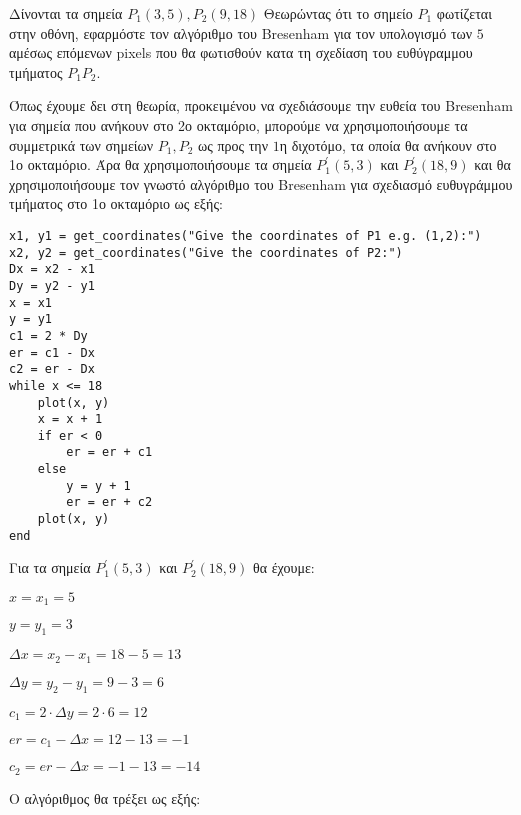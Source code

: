 \begin{exercise}
	Δίνονται τα σημεία $P_1(3, 5), P_2 (9, 18)$ Θεωρώντας ότι το σημείο $P_1$ φωτίζεται στην οθόνη, εφαρμόστε τον αλγόριθμο του Bresenham για τον υπολογισμό των $5$ αμέσως επόμενων pixels που θα φωτισθούν κατα τη σχεδίαση του ευθύγραμμου τμήματος $P_1 P_2$.	
\end{exercise}


\begin{solution}

Όπως έχουμε δει στη θεωρία, προκειμένου να σχεδιάσουμε την ευθεία του Bresenham για σημεία που ανήκουν στο 2ο οκταμόριο, μπορούμε να χρησιμοποιήσουμε τα συμμετρικά των σημείων $P_1, P_2$ ως προς την $1$η διχοτόμο, τα οποία θα ανήκουν στο 1ο οκταμόριο. Άρα θα χρησιμοποιήσουμε τα σημεία $P_1^{'}(5,3)$ και $P_2^{'}(18,9)$ και θα χρησιμοποιήσουμε τον γνωστό αλγόριθμο του Bresenham για σχεδιασμό ευθυγράμμου τμήματος στο 1ο οκταμόριο ως εξής:

\begin{lstlisting}[caption={Αλγόριθμος του Bresenham για 1ο οκταμόριο}]
x1, y1 = get_coordinates("Give the coordinates of P1 e.g. (1,2):")
x2, y2 = get_coordinates("Give the coordinates of P2:")
Dx = x2 - x1
Dy = y2 - y1
x = x1
y = y1
c1 = 2 * Dy
er = c1 - Dx
c2 = er - Dx
while x <= 18
    plot(x, y)
    x = x + 1
    if er < 0
        er = er + c1
    else
        y = y + 1
        er = er + c2
    plot(x, y)
end
\end{lstlisting}


Για τα σημεία \( P_1^{'}(5, 3) \) και \( P_2^{'}(18, 9) \) θα έχουμε:

\begin{itemize}[noitemsep, topsep=0pt] %
\begin{multicols}{2} %
  \item \( x = x_1 = 5 \)
  \item \( y = y_1 = 3 \)
  \item \( \Delta x = x_2 - x_1 = 18 - 5 = 13 \)
  \item \( \Delta y = y_2 - y_1 = 9 - 3 = 6 \)
  \item \( c_1 = 2 \cdot \Delta y = 2 \cdot 6 = 12 \)
  \item \( er = c_1 - \Delta x = 12 - 13 = -1 \)
  \item \( c_2 = er - \Delta x = -1 - 13 = -14 \)
\end{multicols}
\end{itemize}

Ο αλγόριθμος θα τρέξει ως εξής:


\end{solution}
